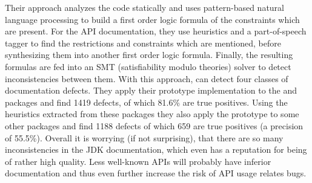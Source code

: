 Their approach analyzes the code statically and uses pattern-based natural language processing to build a first order logic formula of the constraints which are present.
For the API documentation, they use heuristics and a part-of-speech tagger to find the restrictions and constraints which are mentioned, before synthesizing them into another first order logic formula.
Finally, the resulting formulas are fed into an SMT (satisfiability modulo theories) solver \cite{barrett2009satisfiability} to detect inconsistencies between them.
With this approach, can detect four classes of documentation defects.
They apply their prototype implementation to the  and  packages and find 1419 defects, of which 81.6\% are true positives.
Using the heuristics extracted from these packages they also apply the prototype to some other packages and find 1188 defects of which 659 are true positives (a precision of 55.5\%).
Overall it is worrying (if not surprising), that there are so many inconsistencies in the JDK documentation, which even has a reputation for being of rather high quality.
Less well-known APIs will probably have inferior documentation and thus even further increase the risk of API usage relates bugs.


